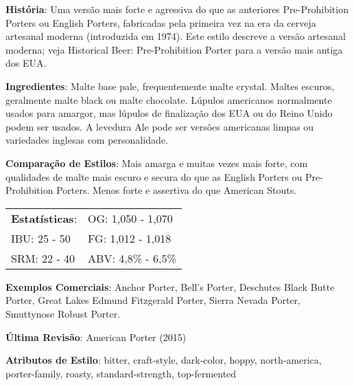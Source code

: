 \textbf{História}: Uma versão mais forte e agressiva do que as anteriores Pre-Prohibition Porters ou English Porters, fabricadas pela primeira vez na era da cerveja artesanal moderna (introduzida em 1974). Este estilo descreve a versão artesanal moderna; veja Historical Beer: Pre-Prohibition Porter para a versão mais antiga dos EUA.

\textbf{Ingredientes}: Malte base pale, frequentemente malte crystal. Maltes escuros, geralmente malte black ou malte chocolate. Lúpulos americanos normalmente usados para amargor, mas lúpulos de finalização dos EUA ou do Reino Unido podem ser usados. A levedura Ale pode ser versões americanas limpas ou variedades inglesas com personalidade.

\textbf{Comparação de Estilos}: Mais amarga e muitas vezes mais forte, com qualidades de malte mais escuro e secura do que as English Porters ou Pre-Prohibition Porters. Menos forte e assertiva do que American Stouts.

\begin{tabular}{@{}p{35mm}p{35mm}@{}}
  \textbf{Estatísticas}: & OG: 1,050 - 1,070 \\
  IBU: 25 - 50  & FG: 1,012 - 1,018 \\
  SRM: 22 - 40  & ABV: 4,8\% - 6,5\%
\end{tabular}

\textbf{Exemplos Comerciais}: Anchor Porter, Bell’s Porter, Deschutes Black Butte Porter, Great Lakes Edmund Fitzgerald Porter, Sierra Nevada Porter, Smuttynose Robust Porter.

\textbf{Última Revisão}: American Porter (2015)

\textbf{Atributos de Estilo}: bitter, craft-style, dark-color, hoppy, north-america, porter-family, roasty, standard-strength, top-fermented

